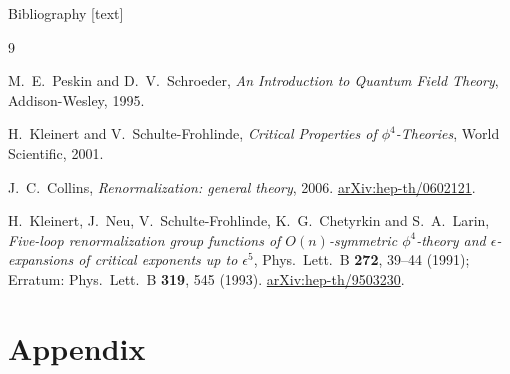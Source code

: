 \documentclass[aspectratio=169,10pt]{beamer}
\begin{document}
\begin{frame}{Bibliography}
\footnotesize
{}[text]

\begin{thebibliography}{9}

M.~E.~Peskin and D.~V.~Schroeder,
\emph{An Introduction to Quantum Field Theory},
Addison-Wesley, 1995.

H.~Kleinert and V.~Schulte-Frohlinde,
\emph{Critical Properties of $\phi^4$-Theories},
World Scientific, 2001.

J.~C.~Collins,
\emph{Renormalization: general theory},
2006.
\href{https://arxiv.org/abs/hep-th/0602121}{arXiv:hep-th/0602121}.

H.~Kleinert, J.~Neu, V.~Schulte-Frohlinde, K.~G.~Chetyrkin and S.~A.~Larin,
\emph{Five-loop renormalization group functions of $O(n)$-symmetric $\phi^4$-theory and $\epsilon$-expansions of critical exponents up to $\epsilon^5$},
Phys.\ Lett.\ B \textbf{272}, 39--44 (1991);
Erratum: Phys.\ Lett.\ B \textbf{319}, 545 (1993).
\href{https://arxiv.org/abs/hep-th/9503230}{arXiv:hep-th/9503230}.

\end{thebibliography}
\end{frame}


\appendix
\section{Appendix}

\setcounter{equation}{0}
\renewcommand{\theequation}{A.\arabic{equation}}

\newcommand{\Kloop}{(16\pi^2)}
\newcommand{\Lmass}{L_m}
\newcommand{\appref}[1]{\par\smallskip{\scriptsize #1}}
\end{document}
